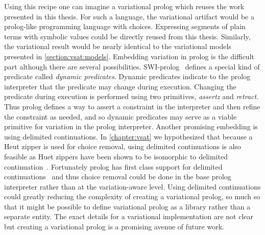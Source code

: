 Using this recipe one can imagine a variational prolog which reuses the work
presented in this thesis. For such a language, the variational artifact would be
a prolog-like programming language with choices. Expressing segments of plain
terms with symbolic values could be directly reused from this thesis. Similarly,
the variational result would be nearly identical to the variational models
presented in \autoref{section:vsat:models}. Embedding variation in prolog is the
difficult part although there are several possibilities.
SWI-prolog~\cite{wielemaker:2011:tplp} defines a special kind of predicate
called \emph{dynamic predicates}. Dynamic predicates indicate to the prolog
interpreter that the predicate may change during execution. Changing the
predicate during execution is performed using two primitives, \emph{assertz} and
\emph{retract}. Thus prolog defines a way to assert a constraint in the
interpreter and then refine the constraint as needed, and so dynamic predicates
may serve as a viable primitive for variation in the prolog interpreter. Another
promising embedding is using delimited continuations. In \autoref{chapter:vsat}
we hypothesized that because a Heut zipper is used for choice removal, using
delimited continuations is also feasible as Huet zippers have been shown to be
isomorphic to delimited continuation~\cite{olegZippers}. Fortunately prolog has
first class support for delimited
continuations~\cite{DBLP:journals/tplp/SchrijversDDW13} and thus choice removal
could be done in the base prolog interpreter rather than at the variation-aware
level. Using delimited continuations could greatly reducing the complexity of
creating a variational prolog, so much so that it might be possible to define
variational prolog as a library rather than a separate entity. The exact details
for a variational implementation are not clear but creating a variational prolog
is a promising avenue of future work.

